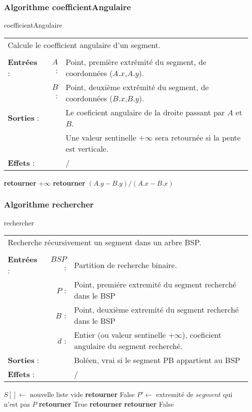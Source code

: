 \documentclass[10pt]{article}
\begin{document}
\subsubsection{Algorithme coefficientAngulaire}
\begin{algorithm}
\caption{coefficientAngulaire}
\begin{tabular}{lrl}
\multicolumn{3}{l}{Calcule le coefficient angulaire d'un segment.}\\
&&\\
\textbf{Entrées} : &$A$ : &Point, première extrêmité du segment, de coordonnées ($A.x$,$A.y$).\\
&$B$ :&Point, deuxième extrêmité du segment, de coordonnées ($B.x$,$B.y$).\\
\textbf{Sorties} :& &Le coeficient angulaire de la droite passant par $A$ et $B$.\\
& &Une valeur sentinelle $+\infty$ sera retournée si la pente est verticale.\\
\textbf{Effets} :& &/
\end{tabular}
\begin{algorithmic}[1]
\State \textbf{retourner} $+\infty$
\Else
\State \textbf{retourner} $(A.y-B.y)/(A.x-B.x)$
\EndIf
\EndProcedure
\end{algorithmic}
\end{algorithm}

\subsubsection{Algorithme rechercher}
\begin{algorithm}[H]
\caption{rechercher}
\begin{tabular}{lrl}
\multicolumn{3}{l}{Recherche récursivement un segment dans un arbre BSP.}\\
&&\\
\textbf{Entrées} : &$BSP$ : &Partition de recherche binaire.\\
& $P$ : &Point, premiére extremité du segment recherché dans le BSP\\
& $B$ : &Point, deuxième extremité du segment recherché dans le BSP\\
& $d$ : &Entier (ou valeur sentinelle $+\infty$), coeficient angulaire du segment recherché.\\
\textbf{Sorties} :& &Boléen, vrai si le segment PB appartient au BSP\\
\textbf{Effets} :& &/
\end{tabular}
\begin{algorithmic}[1]
\State $S[ ] \gets$ nouvelle liste vide
\State {}
\State {}
\State \textbf{retourner} False
\Else 
{}
\State $P'\gets$ extremité de $segment$ qui n'est pas $P$
\State \textbf{retourner} True
\State \textbf{retourner} 
\EndIf
\EndIf
\EndFor
\EndIf
\State \textbf{retourner} False
\EndProcedure
\end{algorithmic}
\end{algorithm}
\end{document}
